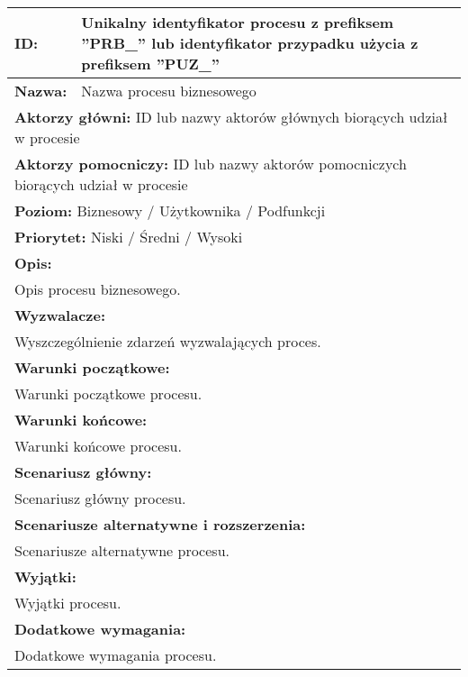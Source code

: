 \begin{center}
\begin{longtable}[h]{|p{1.6cm}|p{13.5cm}|}
\hline
\textbf{ID:} & Unikalny identyfikator procesu z prefiksem ''PRB\_'' lub identyfikator przypadku użycia z prefiksem ''PUZ\_'' \\ \hline
\textbf{Nazwa:} & Nazwa procesu biznesowego \\ \hline
\multicolumn{2}{|p{15.1cm}|}{\textbf{Aktorzy główni:} ID lub nazwy aktorów głównych biorących udział w procesie} \\
\multicolumn{2}{|p{15.1cm}|}{\textbf{Aktorzy pomocniczy:} ID lub nazwy aktorów pomocniczych biorących udział w procesie} \\
\multicolumn{2}{|p{15.1cm}|}{\textbf{Poziom:}  Biznesowy / Użytkownika / Podfunkcji} \\
\multicolumn{2}{|p{15.1cm}|}{\textbf{Priorytet:}  Niski / Średni / Wysoki} \\
\hline
\multicolumn{2}{|p{15.1cm}|}{\textbf{Opis:}} \\
\multicolumn{2}{|p{15.1cm}|}{Opis procesu biznesowego.
} \\ \hline
\multicolumn{2}{|p{15.1cm}|}{\textbf{Wyzwalacze:}} \\
\multicolumn{2}{|p{15.1cm}|}{Wyszczególnienie zdarzeń wyzwalających proces.
} \\ \hline
\multicolumn{2}{|p{15.1cm}|}{\textbf{Warunki początkowe:}} \\
\multicolumn{2}{|p{15.1cm}|}{Warunki początkowe procesu.
} \\ \hline
\multicolumn{2}{|p{15.1cm}|}{\textbf{Warunki końcowe:}} \\
\multicolumn{2}{|p{15.1cm}|}{Warunki końcowe procesu.
} \\ \hline
\multicolumn{2}{|p{15.1cm}|}{\textbf{Scenariusz główny:}} \\
\multicolumn{2}{|p{15.1cm}|}{Scenariusz główny procesu.
} \\ \hline
\multicolumn{2}{|p{15.1cm}|}{\textbf{Scenariusze alternatywne i rozszerzenia:}} \\
\multicolumn{2}{|p{15.1cm}|}{Scenariusze alternatywne procesu.
} \\ \hline
\multicolumn{2}{|p{15.1cm}|}{\textbf{Wyjątki:}} \\
\multicolumn{2}{|p{15.1cm}|}{Wyjątki procesu.
} \\ \hline
\multicolumn{2}{|p{15.1cm}|}{\textbf{Dodatkowe wymagania:}} \\
\multicolumn{2}{|p{15.1cm}|}{Dodatkowe wymagania procesu.
} \\
\hline
\end{longtable}
\end{center}

